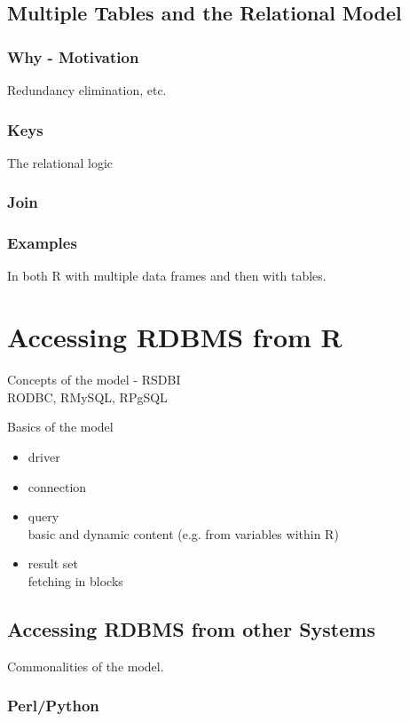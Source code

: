 \documentclass[11pt,timesroman]{article}
\begin{document}
\subsection{Multiple Tables and the Relational Model}

\subsubsection{Why - Motivation}
 Redundancy elimination, etc.

\subsubsection{Keys} 
  The relational logic

\subsubsection{Join}

\subsubsection{Examples}
 In both R with multiple data frames and then with tables.

\section{Accessing RDBMS from R}
Concepts of the model - RSDBI \\
  RODBC, RMySQL, RPgSQL 

Basics of the model
\begin{itemize}
\item driver
\item connection
\item query \\
       basic and dynamic content (e.g. from variables within R)
\item result set \\ 
       fetching in blocks

\end{itemize}

\subsection{Accessing RDBMS from other Systems}
Commonalities of the model.
\subsubsection{Perl/Python}
\end{document}
